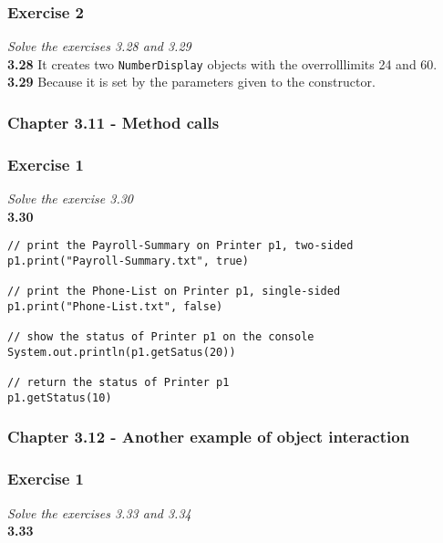 \subsubsection*{Exercise 2}
\textit{Solve the exercises 3.28 and 3.29}\\

\textbf{3.28} It creates two \lstinline!NumberDisplay! objects with the 
overrolllimits 24 and 60. \\

\textbf{3.29} Because it is set by the parameters given to the constructor.

\subsubsection{Chapter 3.11 - Method calls}

\subsubsection*{Exercise 1}
\textit{Solve the exercise 3.30}\\

\textbf{3.30} 
\begin{lstlisting}
// print the Payroll-Summary on Printer p1, two-sided
p1.print("Payroll-Summary.txt", true)

// print the Phone-List on Printer p1, single-sided
p1.print("Phone-List.txt", false)

// show the status of Printer p1 on the console
System.out.println(p1.getSatus(20))

// return the status of Printer p1
p1.getStatus(10)
\end{lstlisting}

\subsubsection{Chapter 3.12 - Another example of object interaction}

\subsubsection*{Exercise 1}
\textit{Solve the exercises 3.33 and 3.34}\\

\textbf{3.33}







